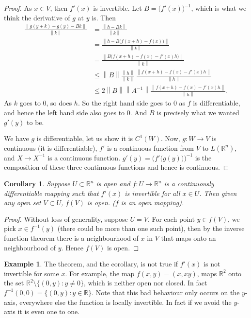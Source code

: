 \documentclass[12pt]{book}
\newcommand{\norm}[1]{\left\lVert {#1} \right\rVert}
\newcommand{\R}{{\mathbb{R}}}
\theoremstyle{plain}
\newtheorem{cor}[thm]{Corollary}
\theoremstyle{remark}
\theoremstyle{definition}
\theoremstyle{exercise}
\theoremstyle{example}
\newtheorem{example}[thm]{Example}
\begin{document}
\begin{proof}
As $x \in V$, then $f'(x)$ is invertible.
Let $B = \bigl(f'(x)\bigr)^{-1}$, which is what we think the derivative of
$g$ at $y$ is.  Then
\begin{equation*}
\begin{split}
\frac{\norm{g(y+k)-g(y)-Bk}}{\norm{k}}
& =
\frac{\norm{h-Bk}}{\norm{k}}
\\
& =
\frac{\norm{h-B\bigl(f(x+h)-f(x)\bigr)}}{\norm{k}}
\\
& =
\frac{\norm{B\bigl(f(x+h)-f(x)-f'(x)h\bigr)}}{\norm{k}}
\\
& \leq
\norm{B}
\frac{\norm{h}}{\norm{k}}\,
\frac{\norm{f(x+h)-f(x)-f'(x)h}}{\norm{h}}
\\
& \leq
2\norm{B}\norm{A^{-1}}
\frac{\norm{f(x+h)-f(x)-f'(x)h}}{\norm{h}} .
\end{split}
\end{equation*}
As $k$ goes to 0, so does $h$.  So the right hand side goes to 0 as $f$ is
differentiable, and hence
the left hand side also goes to 0.  And
$B$ is precisely what we wanted $g'(y)$ to be.

We have $g$ is differentiable, let us show it is $C^1(W)$.
Now, $g \colon W \to V$ is continuous (it is differentiable),
$f'$ is a continuous function from $V$
to $L(\R^n)$, and $X \to X^{-1}$ is a continuous function.  
$g'(y) = {\bigl( f'\bigl(g(y)\bigr)\bigr)}^{-1}$ is the composition
of these three
continuous functions and hence is continuous.
\end{proof}

\begin{cor}
Suppose $U \subset \R^n$ is open and $f \colon U \to \R^n$ is a continuously
differentiable mapping such that $f'(x)$ is invertible for all $x \in U$.  Then
given any open set $V \subset U$, $f(V)$ is open.  ($f$ is an open mapping).
\end{cor}

\begin{proof}
Without loss of generality, suppose $U=V$.
For each point $y \in f(V)$, we pick $x \in f^{-1}(y)$ (there could be more
than one such point), then by the inverse function theorem there is a
neighbourhood of $x$ in $V$ that maps onto an neighbourhood of $y$.  Hence
$f(V)$ is open.
\end{proof}

\begin{example}
The theorem, and the corollary, is not true if $f'(x)$ is not invertible for
some $x$.  For example,
the map $f(x,y) = (x,xy)$, maps $\R^2$ onto the set
$\R^2 \setminus \{ (0,y) : y \neq 0 \}$, which is neither open nor closed.
In fact $f^{-1}(0,0) = \{ (0,y) : y \in \R \}$.  Note that this bad behaviour
only occurs on the $y$-axis, everywhere else the function is locally
invertible.  In fact if we avoid the $y$-axis it is even one to one.
\end{example}
\end{document}
